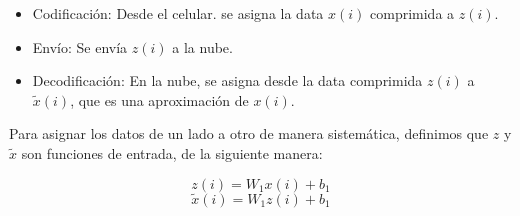     \begin{itemize}
        \item Codificación: Desde el celular. se asigna la data $x(i)$ comprimida a $z(i)$.
        \item Envío: Se envía $z(i)$ a la nube.
        \item Decodificación: En la nube, se asigna desde la data comprimida $z(i)$ a $\tilde{x}(i)$, que es una aproximación de $x(i)$.
    \end{itemize}

    Para asignar los datos de un lado a otro de manera sistemática, definimos que $z$ y $\tilde{x}$ son funciones de entrada, de la siguiente manera:

    \begin{equation}
        z{(i)} =W_1x{(i)} + b_1
    \end{equation}
    \begin{equation}
        \tilde{x}{(i)} =W_1z{(i)} + b_1
    \end{equation}

